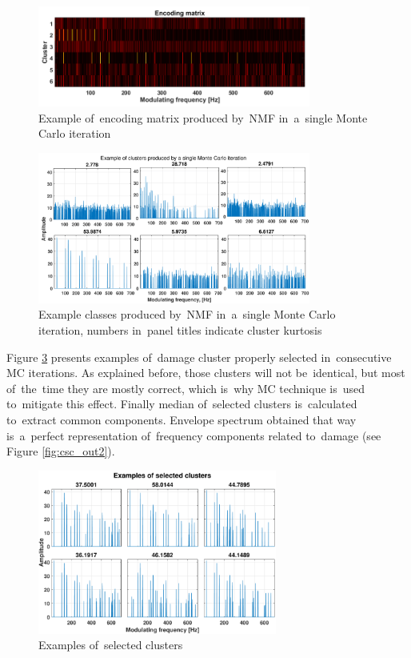 \begin{figure}[ht!]
\centering
\includegraphics[width=0.8\textwidth]{wykresy/csc_enc2}
\caption{Example of~encoding matrix produced by~NMF in~a~single Monte Carlo iteration}
\label{fig:csc_enc}
\end{figure}

\begin{figure}[ht!]
\centering
\includegraphics[width=0.8\textwidth]{wykresy/csc_clusters}
\caption{Example classes produced by~NMF in~a~single Monte Carlo iteration, numbers in~panel titles indicate cluster kurtosis}
\label{fig:csc_classes}
\end{figure}

Figure \ref{fig:csc_multi} presents examples of~damage cluster properly selected in~consecutive MC iterations. As explained before, those clusters will not be~identical, but most of~the~time they are mostly correct, which is~why MC technique is~used to~mitigate this effect. Finally median of~selected clusters is~calculated to~extract common components. Envelope spectrum obtained that way is~a~perfect representation of~frequency components related to~damage (see Figure \ref{fig:csc_out2}).

\begin{figure}[ht!]
\centering
\includegraphics[width=0.7\textwidth]{wykresy/csc_multi}
\caption{Examples of~selected clusters}
\label{fig:csc_multi}
\end{figure}

